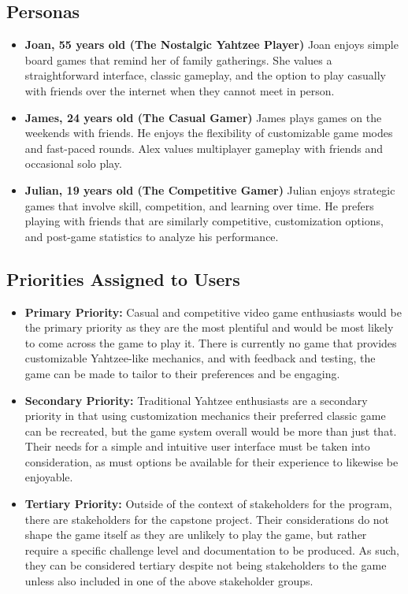 \subsection{Personas}

\begin{itemize}
	\item \textbf{Joan, 55 years old (The Nostalgic Yahtzee Player)} Joan enjoys simple board games that remind her of family gatherings. She values a straightforward interface, classic gameplay, and the option to play casually with friends over the internet when they cannot meet in person.
	\item \textbf{James, 24 years old (The Casual Gamer)} James plays games on the weekends with friends. He enjoys the flexibility of customizable game modes and fast-paced rounds. Alex values multiplayer gameplay with friends and occasional solo play.
	\item \textbf{Julian, 19 years old (The Competitive Gamer)} Julian enjoys strategic games that involve skill, competition, and learning over time. He prefers playing with friends that are similarly competitive, customization options, and post-game statistics to analyze his performance.
\end{itemize}

\subsection{Priorities Assigned to Users}

\begin{itemize}
	\item \textbf{Primary Priority:} Casual and competitive video game enthusiasts would be the primary priority as they are the most plentiful and would be most likely to come across the game to play it. There is currently no game that provides customizable Yahtzee-like mechanics, and with feedback and testing, the game can be made to tailor to their preferences and be engaging.
	\item \textbf{Secondary Priority:} Traditional Yahtzee enthusiasts are a secondary priority in that using customization mechanics their preferred classic game can be recreated, but the game system overall would be more than just that. Their needs for a simple and intuitive user interface must be taken into consideration, as must options be available for their experience to likewise be enjoyable.
	\item \textbf{Tertiary Priority:} Outside of the context of stakeholders for the program, there are stakeholders for the capstone project. Their considerations do not shape the game itself as they are unlikely to play the game, but rather require a specific challenge level and documentation to be produced. As such, they can be considered tertiary despite not being stakeholders to the game unless also included in one of the above stakeholder groups.
\end{itemize}


